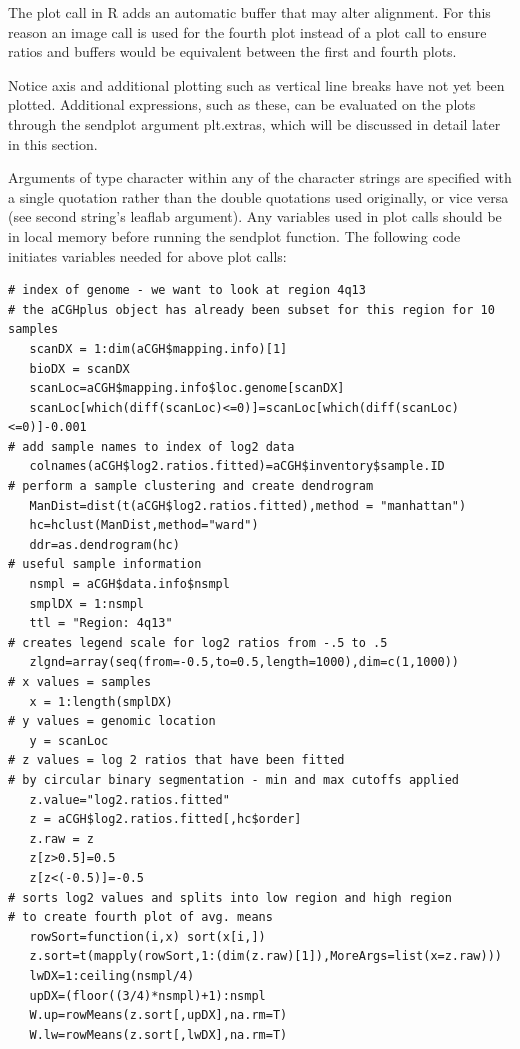 \documentclass[]{article}
\begin{document}
  The plot call in R adds an automatic buffer that may alter alignment. For this reason  an image call is used for the fourth plot instead of a plot call to ensure ratios and buffers would be equivalent between the first and fourth plots. 

 Notice axis and additional plotting such as vertical line breaks have not yet been plotted. Additional expressions, such as these, can be evaluated on the plots through the sendplot argument plt.extras, which will be discussed in detail later in this section. \newline

\indent Arguments of type character within any of the character strings are specified with a single quotation rather than the double quotations used originally, or vice versa (see second string's leaflab argument). Any variables used in plot calls should be in local memory before running the sendplot function. The following code initiates variables needed for above plot calls:
\begin{verbatim}
# index of genome - we want to look at region 4q13 
# the aCGHplus object has already been subset for this region for 10 samples
   scanDX = 1:dim(aCGH$mapping.info)[1]
   bioDX = scanDX
   scanLoc=aCGH$mapping.info$loc.genome[scanDX]
   scanLoc[which(diff(scanLoc)<=0)]=scanLoc[which(diff(scanLoc)<=0)]-0.001
# add sample names to index of log2 data
   colnames(aCGH$log2.ratios.fitted)=aCGH$inventory$sample.ID
# perform a sample clustering and create dendrogram 
   ManDist=dist(t(aCGH$log2.ratios.fitted),method = "manhattan")
   hc=hclust(ManDist,method="ward")
   ddr=as.dendrogram(hc)
# useful sample information
   nsmpl = aCGH$data.info$nsmpl
   smplDX = 1:nsmpl
   ttl = "Region: 4q13"
# creates legend scale for log2 ratios from -.5 to .5
   zlgnd=array(seq(from=-0.5,to=0.5,length=1000),dim=c(1,1000))
# x values = samples 
   x = 1:length(smplDX)
# y values = genomic location
   y = scanLoc
# z values = log 2 ratios that have been fitted 
# by circular binary segmentation - min and max cutoffs applied
   z.value="log2.ratios.fitted"
   z = aCGH$log2.ratios.fitted[,hc$order]
   z.raw = z
   z[z>0.5]=0.5
   z[z<(-0.5)]=-0.5
# sorts log2 values and splits into low region and high region
# to create fourth plot of avg. means 
   rowSort=function(i,x) sort(x[i,])
   z.sort=t(mapply(rowSort,1:(dim(z.raw)[1]),MoreArgs=list(x=z.raw)))
   lwDX=1:ceiling(nsmpl/4)
   upDX=(floor((3/4)*nsmpl)+1):nsmpl
   W.up=rowMeans(z.sort[,upDX],na.rm=T)
   W.lw=rowMeans(z.sort[,lwDX],na.rm=T)
\end{verbatim}
\end{document}
